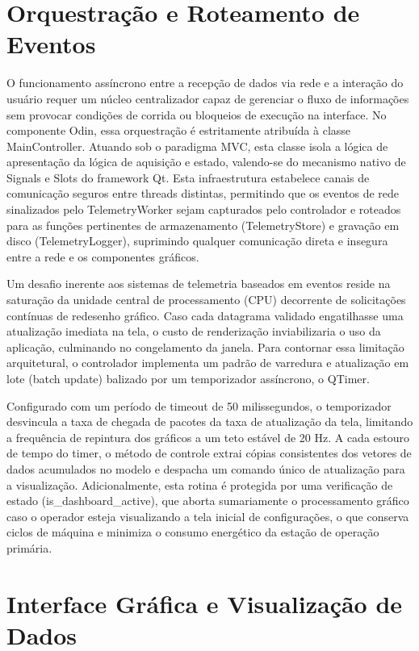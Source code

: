 \section{Orquestração e Roteamento de Eventos}

O funcionamento assíncrono entre a recepção de dados via rede e a interação do usuário requer um núcleo centralizador capaz de gerenciar o fluxo de informações sem provocar condições de corrida ou bloqueios de execução na interface. No componente Odin, essa orquestração é estritamente atribuída à classe MainController. Atuando sob o paradigma MVC, esta classe isola a lógica de apresentação da lógica de aquisição e estado, valendo-se do mecanismo nativo de Signals e Slots do framework Qt. Esta infraestrutura estabelece canais de comunicação seguros entre threads distintas, permitindo que os eventos de rede sinalizados pelo TelemetryWorker sejam capturados pelo controlador e roteados para as funções pertinentes de armazenamento (TelemetryStore) e gravação em disco (TelemetryLogger), suprimindo qualquer comunicação direta e insegura entre a rede e os componentes gráficos.

Um desafio inerente aos sistemas de telemetria baseados em eventos reside na saturação da unidade central de processamento (CPU) decorrente de solicitações contínuas de redesenho gráfico. Caso cada datagrama validado engatilhasse uma atualização imediata na tela, o custo de renderização inviabilizaria o uso da aplicação, culminando no congelamento da janela. Para contornar essa limitação arquitetural, o controlador implementa um padrão de varredura e atualização em lote (batch update) balizado por um temporizador assíncrono, o QTimer.

Configurado com um período de timeout de 50 milissegundos, o temporizador desvincula a taxa de chegada de pacotes da taxa de atualização da tela, limitando a frequência de repintura dos gráficos a um teto estável de 20 Hz. A cada estouro de tempo do timer, o método de controle extrai cópias consistentes dos vetores de dados acumulados no modelo e despacha um comando único de atualização para a visualização. Adicionalmente, esta rotina é protegida por uma verificação de estado (is\_dashboard\_active), que aborta sumariamente o processamento gráfico caso o operador esteja visualizando a tela inicial de configurações, o que conserva ciclos de máquina e minimiza o consumo energético da estação de operação primária.

\section{Interface Gráfica e Visualização de Dados}

